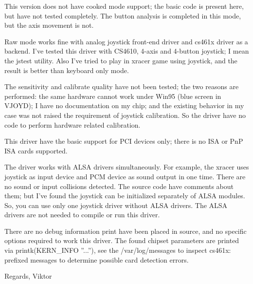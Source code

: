 \documentclass[a4paper,8pt,english]{sphinxmanual}
\begin{document}
This version does not have cooked mode support; the basic code
is present here, but have not tested completely. The button analysis
is completed in this mode, but the axis movement is not.

Raw mode works fine with analog joystick front-end driver and cs461x
driver as a backend. I've tested this driver with CS4610, 4-axis and
4-button joystick; I mean the jstest utility. Also I've tried to
play in xracer game using joystick, and the result is better than
keyboard only mode.

The sensitivity and calibrate quality have not been tested; the two
reasons are performed: the same hardware cannot work under Win95 (blue
screen in VJOYD); I have no documentation on my chip; and the existing
behavior in my case was not raised the requirement of joystick calibration.
So the driver have no code to perform hardware related calibration.

This driver have the basic support for PCI devices only; there is no
ISA or PnP ISA cards supported.

The driver works with ALSA drivers simultaneously. For example, the xracer
uses joystick as input device and PCM device as sound output in one time.
There are no sound or input collisions detected. The source code have
comments about them; but I've found the joystick can be initialized
separately of ALSA modules. So, you can use only one joystick driver
without ALSA drivers. The ALSA drivers are not needed to compile or
run this driver.

There are no debug information print have been placed in source, and no
specific options required to work this driver. The found chipset parameters
are printed via printk(KERN\_INFO ''...''), see the /var/log/messages to
inspect cs461x: prefixed messages to determine possible card detection
errors.

Regards,
Viktor
\end{document}
